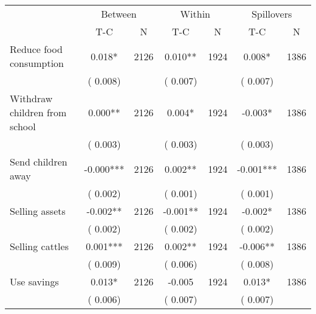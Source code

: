 
\begin{tabular}{l*{6}{c}}\hline&\multicolumn{2}{c}{Between}&\multicolumn{2}{c}{Within}&\multicolumn{2}{c}{Spillovers} \\ \cmidrule(r){2-3}\cmidrule(l){4-5}\cmidrule(l){6-7} & {T-C} & {N} & {T-C} & {N}  & {T-C}  & {N}  \\ \midrule
Reduce food consumption        &              0.018*      &       2126       &              0.010**      &       1924       &              0.008*      &       1386       \\
                       &       (       0.008)            &                               &       (       0.007)            &                               &       (       0.007)            &                               \\
Withdraw children from school        &              0.000**      &       2126       &              0.004*      &       1924       &             -0.003*      &       1386       \\
                       &       (       0.003)            &                               &       (       0.003)            &                               &       (       0.003)            &                               \\
Send children away        &             -0.000***      &       2126       &              0.002**      &       1924       &             -0.001***      &       1386       \\
                       &       (       0.002)            &                               &       (       0.001)            &                               &       (       0.001)            &                               \\
Selling assets        &             -0.002**      &       2126       &             -0.001**      &       1924       &             -0.002*      &       1386       \\
                       &       (       0.002)            &                               &       (       0.002)            &                               &       (       0.002)            &                               \\
Selling cattles        &              0.001***      &       2126       &              0.002**      &       1924       &             -0.006**      &       1386       \\
                       &       (       0.009)            &                               &       (       0.006)            &                               &       (       0.008)            &                               \\
Use savings        &              0.013*      &       2126       &             -0.005      &       1924       &              0.013*      &       1386       \\
                       &       (       0.006)            &                               &       (       0.007)            &                               &       (       0.007)            &                               \\
\hline \end{tabular}